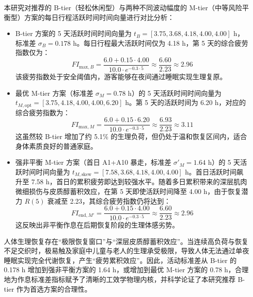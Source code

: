 \documentclass{cumcmthesis}
\begin{document}
本研究对推荐的 B-tier（轻松休闲型）与两种不同波动幅度的 M-tier（中等风险平衡型）方案的每日行程活跃时间时间向量进行对比分析：
\begin{itemize}
\item B-tier 方案的 5 天活跃时间时间向量为 $t_B = [3.75, 3.68, 4.18, 4.00, 4.00]$ h，标准差 $\sigma_B = 0.178$ h。每日行程最大活跃时间仅为 4.18 h，第 5 天的综合疲劳指数仅为：
\begin{equation}
FI_{\text{max}, B} = \frac{6.0 + 0.15 \cdot 4.00}{10.0 \cdot e^{-0.3 \cdot 5}} \approx \frac{6.60}{2.23} \approx 2.96
\end{equation}
该疲劳指数处于安全阈值内，游客能够在夜间通过睡眠实现生理复原。

\item 最优 M-tier 方案（标准差 $\sigma_M = 0.78$ h）的 5 天活跃时间时间向量为 $t_{M, \text{opt}} = [3.75, 4.18, 4.00, 4.00, 6.20]$ h。第 5 天的活跃时间为 6.20 h，对应的综合疲劳指数为：
\begin{equation}
FI_{\text{max}, M} = \frac{6.0 + 0.15 \cdot 6.20}{10.0 \cdot e^{-0.3 \cdot 5}} \approx \frac{6.93}{2.23} \approx 3.11
\end{equation}
这虽然较 B-tier 增加了约 5.1\% 的生理负荷，但仍处于温和恢复区间内，适合身体素质良好的普通家庭。

\item 强非平衡 M-tier 方案（首日 A1+A10 暴走，标准差 $\sigma'_M = 1.64$ h）的 5 天活跃时间时间向量为 $t_{M, \text{skew}} = [7.58, 3.68, 4.18, 4.00, 4.00]$ h。首日活跃时间飙升至 7.58 h，首日的累积疲劳即达到较强水平。随着多日累积带来的深层肌肉微细损伤与皮质醇蓄积效应，在第 5 天即使活跃时间降至 4.00 h，由于恢复潜力 $R(5)$ 衰减至 2.23，其综合疲劳指数仍将达到：
\begin{equation}
FI_{\text{end}, M'} = \frac{6.0 + 0.15 \cdot 4.00}{10.0 \cdot e^{-0.3 \cdot 5}} \approx \frac{6.60}{2.23} \approx 2.96
\end{equation}
这反映出非平衡作息在后期恢复阶段的生理体感劣势。
\end{itemize}

人体生理恢复存在“极限恢复窗口”与“深层皮质醇蓄积效应”。当连续高负荷与恢复不足交织时，极易触及家庭中儿童与老人的生理承受极限，导致人体无法通过单夜睡眠实现完全代谢恢复，产生“疲劳累积效应”。因此，活动标准差从 B-tier 的 0.178 h 增加到强非平衡方案的 1.64 h，或增加到最优 M-tier 方案的 0.78 h，合理地为作息标准差指标赋予了清晰的工效学物理内核，并科学论证了本研究推荐 B-tier 作为首选方案的合理性。
\end{document}
